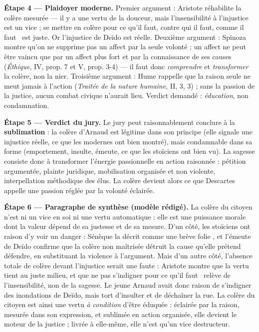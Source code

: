 \documentclass[11pt]{article}
\begin{document}
\begin{exoresolu}
\medskip
\textbf{Étape 4 — Plaidoyer moderne.} Premier argument : Aristote réhabilite la colère mesurée — il y a une vertu de la douceur, mais l'insensibilité à l'injustice est un vice ; se mettre en colère \guillemotleft pour ce qu'il faut, contre qui il faut, comme il faut \guillemotright\ est juste. Or l'injustice de Deïdo est réelle. Deuxième argument : Spinoza montre qu'on ne supprime pas un affect par la seule volonté ; un affect ne peut être vaincu que par un affect plus fort et par la connaissance de ses causes (\emph{Éthique}, IV, prop. 7 et V, prop. 3-4) — il faut donc \emph{comprendre} et \emph{transformer} la colère, non la nier. Troisième argument : Hume rappelle que la raison seule ne meut jamais à l'action (\emph{Traitée de la nature humaine}, II, 3, 3) ; sans la passion de la justice, aucun combat civique n'aurait lieu. Verdict demandé : \emph{éducation}, non condamnation.

\medskip
\textbf{Étape 5 — Verdict du jury.} Le jury peut raisonnablement conclure à la \textbf{sublimation} : la colère d'Arnaud est légitime dans son principe (elle signale une injustice réelle, ce que les modernes ont bien montré), mais condamnable dans sa forme (emportement, insulte, émeute, ce que les stoïciens ont bien vu). La sagesse consiste donc à transformer l'énergie passionnelle en action raisonnée : pétition argumentée, plainte juridique, mobilisation organisée et non violente, interpellation méthodique des élus. La colère devient alors ce que Descartes appelle une passion réglée par la volonté éclairée.

\medskip
\textbf{Étape 6 — Paragraphe de synthèse (modèle rédigé).} La colère du citoyen n'est ni un vice en soi ni une vertu automatique : elle est une puissance morale dont la valeur dépend de sa justesse et de sa mesure. D'un côté, les stoïciens ont raison d'y voir un danger : Sénèque la décrit comme une \guillemotleft brève folie \guillemotright, et l'émeute de Deïdo confirme que la colère non maîtrisée détruit la cause qu'elle prétend défendre, en substituant la violence à l'argument. Mais d'un autre côté, l'absence totale de colère devant l'injustice serait une faute : Aristote montre que la vertu tient au juste milieu, et que ne pas s'indigner \guillemotleft pour ce qu'il faut \guillemotright\ relève de l'insensibilité, non de la sagesse. Le jeune Arnaud avait donc raison de s'indigner des inondations de Deïdo, mais tort d'insulter et de déchaîner la rue. La colère du citoyen est ainsi une vertu \emph{à condition} d'être éduquée : éclairée par la raison, mesurée dans son expression, et sublimée en action organisée, elle devient le moteur de la justice ; livrée à elle-même, elle n'est qu'un vice destructeur.
\end{exoresolu}
\end{document}
